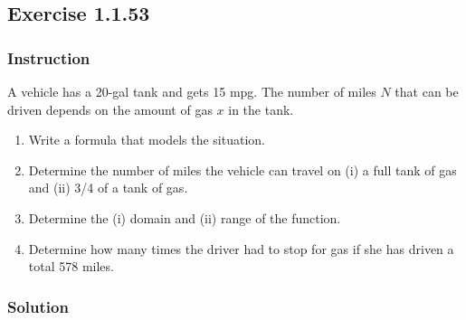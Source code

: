 \subsection*{Exercise 1.1.53}

\subsubsection*{Instruction}

A vehicle has a 20-gal tank and gets 15 mpg. The number of miles $ N $ that can be driven depends on the amount of gas $ x $ in the tank.

\begin{enumerate}[label = (\alph*)]
  \item
    Write a formula that models the situation.
  \item
    Determine the number of miles the vehicle can travel on (i) a full tank of gas and (ii) 3/4 of a tank of gas.
  \item
    Determine the (i) domain and (ii) range of the function.
  \item
    Determine how many times the driver had to stop for gas if she has driven a total 578 miles.
\end{enumerate}

\subsubsection*{Solution}

